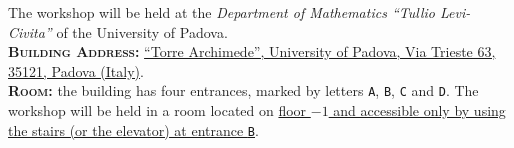 \documentclass{article}
\begin{document}
\noindent The workshop will be held at the \textit{Department of Mathematics ``Tullio Levi-Civita''} of the University of Padova.\\

\noindent \textbf{\textsc{Building Address:}} \href{https://www.google.com/maps/place/Torre+Archimede,+Via+Trieste,+63,+35121+Padova+PD/@45.4113787,11.8848977,901m/data=!3m2!1e3!4b1!4m6!3m5!1s0x477eda58b44676df:0xfacae5884fca17f5!8m2!3d45.4113787!4d11.8874726!16s\%2Fg\%2F12xqbl_z1?entry=ttu&g_ep=EgoyMDI0MTAwOC4wIKXMDSoASAFQAw\%3D\%3D}{``Torre Archimede'', University of Padova, Via Trieste 63, 35121, Padova (Italy)}.\\

\noindent \textbf{\textsc{Room:}} the building has four entrances, marked by letters \texttt{A}, \texttt{B}, \texttt{C} and \texttt{D}.
The workshop will be held in a room located on \underline{floor $-1$ and accessible only by using the stairs (or the elevator) at entrance \texttt{B}}.
\end{document}
